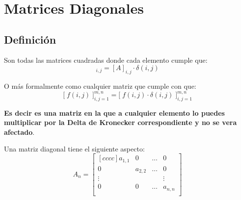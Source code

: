 \documentclass[12pt, fleqn]{report}                             %
\theoremstyle{break}                                            %
\newcommand{\BigBrackets}[1] {\Big[ \; #1 \; \Big]}             %
\begin{document}
        \clearpage
        \section{Matrices Diagonales}

            \subsection{Definición}

                Son todas las matrices cuadradas donde cada elemento cumple que:
                \begin{equation*}
                    [A]_{i,j} = [A]_{i,j} \cdot \delta(i,j)
                \end{equation*}

                O más formalmente como cualquier matriz que cumple con que:
                \begin{equation*}
                    \BigBrackets{f(i,j)}_{i, j = 1}^{m, n} 
                        =
                    \BigBrackets{f(i,j) \cdot \delta(i,j) }_{i, j = 1}^{m, n}  
                \end{equation*}

                \textbf{Es decir es una matriz en la que a cualquier elemento lo puedes multiplicar 
                por la Delta de Kronecker correspondiente y no se vera afectado}.

                Una matriz diagonal tiene el siguiente aspecto:
                \begin{equation*}
                    A_n =
                    \begin{bmatrix}[cccc]
                        a_{1,1} & 0         & \dots & 0         \\
                        0       & a_{2,2}   & \dots & 0         \\
                        \vdots  &           &       & \vdots    \\
                        0       & 0         & \dots & a_{n,n}   \\
                    \end{bmatrix}
                \end{equation*}
\end{document}
